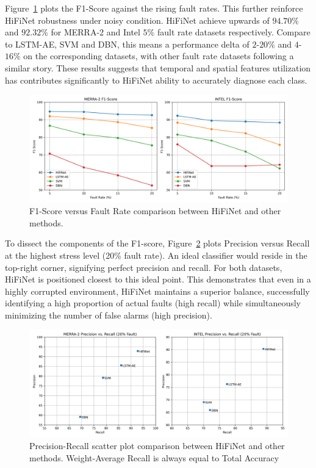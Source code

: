 Figure~\ref{fig:f1} plots the F1-Score against the rising fault rates. This further reinforce HiFiNet robustness under noisy condition. HiFiNet achieve upwards of \(94.70\%\) and \(92.32\%\) for MERRA-2 and Intel \(5\%\) fault rate datasets respectively. Compare to LSTM-AE, SVM and DBN, this means a performance delta of \(2\)-\(20\%\) and \(4\)-\(16\%\) on the corresponding datasets, with other fault rate datasets following a similar story. These results suggests that temporal and spatial features utilization has contributes significantly to HiFiNet ability to accurately diagnose each class.

\begin{figure}
  \centering
  \includegraphics[width=\linewidth]{images/f1.png}
  \caption{F1-Score versus Fault Rate comparison between HiFiNet and other methods.}
  \label{fig:f1}
\end{figure}

To dissect the components of the F1-score, Figure~\ref{fig:pr_scatter} plots Precision versus Recall at the highest stress level (20\% fault rate). An ideal classifier would reside in the top-right corner, signifying perfect precision and recall. For both datasets, HiFiNet is positioned closest to this ideal point. This demonstrates that even in a highly corrupted environment, HiFiNet maintains a superior balance, successfully identifying a high proportion of actual faults (high recall) while simultaneously minimizing the number of false alarms (high precision).

\begin{figure}
  \centering
  \includegraphics[width=\linewidth]{images/pr_scatter.png}
  \caption{Precision-Recall scatter plot comparison between HiFiNet and other methods. Weight-Average Recall is always equal to Total Accuracy}
  \label{fig:pr_scatter}
\end{figure}

